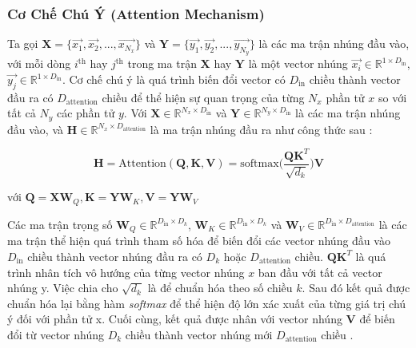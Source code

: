 \subsubsection{Cơ Chế Chú Ý (Attention Mechanism)}
\label{sec:attentionMechanism}

Ta gọi $\mathbf{X} = \Big\{\overrightarrow{x_1}, \overrightarrow{x_2}, ...,  \overrightarrow{x_{N_x}}\Big\}$ và $\mathbf{Y} = \Big\{\overrightarrow{y_1}, \overrightarrow{y_2}, ...,  \overrightarrow{y_{N_y}}\Big\}$ là các ma trận nhúng đầu vào, với mỗi dòng $i^{\text{th}}$ hay $j^{\text{th}}$ trong ma trận $\mathbf{X}$ hay $\mathbf{Y}$ là một vector nhúng $\overrightarrow{x_i} \in \mathbb{R}^{1 \times D_{\text{in}}}$, $\overrightarrow{y_j} \in \mathbb{R}^{1 \times D_{\text{in}}}$.
Cơ chế chú ý là quá trình biến đổi vector có $D_{\text{in}}$ chiều thành vector đầu ra có $D_{\text{attention}}$ chiều để thể hiện sự quan trọng của từng $N_x$ phần tử $x$ so với tất cả $N_y$ các phần tử $y$. Với $\mathbf{X} \in \mathbb{R}^{N_x \times D_\text{in}}$ và $\mathbf{Y} \in \mathbb{R}^{N_y \times D_\text{in}}$ là các ma trận nhúng đầu vào, và $\mathbf{H} \in \mathbb{R}^{N_x \times D_\text{attention}}$ là ma trận nhúng đầu ra như công thức sau :

\begin{equation}
\label{attention}
\mathbf{H} = \text{Attention}(\mathbf{Q}, \mathbf{K}, \mathbf{V}) = \text{softmax}\Big(\frac{\mathbf{Q}\mathbf{K}^T}{\sqrt{d_k}}\Big) \mathbf{V}
\end{equation}

với  $\mathbf{Q} = \mathbf{X}\mathbf{W}_Q, \mathbf{K} = \mathbf{Y} \mathbf{W}_K, \mathbf{V} = \mathbf{Y} \mathbf{W}_V$

Các ma trận trọng số 
$\mathbf{W}_Q \in \mathbb{R}^{D_{\text{in}} \times D_{k}}$, 
$\mathbf{W}_K \in \mathbb{R}^{D_{\text{in}} \times D_{k}}$ và 
$\mathbf{W}_V \in \mathbb{R}^{D_{\text{in}} \times D_{\text{attention}}}$ là các ma trận thể hiện quá trình tham số hóa để biến đổi các vector nhúng đầu vào $D_{\text{in}}$ chiều thành vector nhúng đầu ra có $D_{k}$ hoặc $D_{\text{attention}}$ chiều. $\mathbf{Q}\mathbf{K}^T$ là quá trình nhân tích vô hướng của từng vector nhúng $x$ ban đầu với tất cả vector nhúng y. Việc chia cho $\sqrt{d_k}$ là để chuẩn hóa theo số chiều $k$. Sau đó kết quả được chuẩn hóa lại bằng hàm \textit{softmax} để thể hiện độ lớn xác xuất của từng giá trị chú ý đối với phần tử x. Cuối cùng, kết quả được nhân với vector nhúng $\mathbf{V}$ để biến đổi từ vector nhúng $D_{k}$ chiều thành vector nhúng mới  $D_{\text{attention}}$ chiều .

